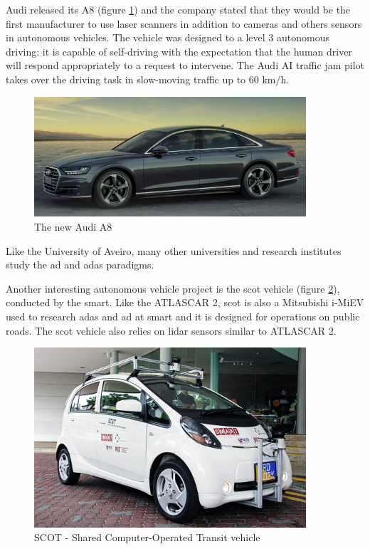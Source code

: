 Audi released its A8 (figure \ref{fig:audi}) and the company stated that they would be the first manufacturer to use laser scanners in addition to cameras and others sensors in autonomous vehicles. The vehicle was designed to a level 3 autonomous driving: it is capable of self-driving with the expectation that the human driver will respond appropriately to a request to intervene. The Audi AI traffic jam pilot takes over the driving task in slow-moving traffic up to 60 km/h. \cite{AudiMediaCenter}

\begin{figure}[htp]
	
	\centering
	\includegraphics[width=0.9\textwidth]{capstate/imgs/audi}
	
	\caption{The new Audi A8}
	\label{fig:audi}
	
\end{figure}

Like the University of Aveiro, many other universities and research institutes study the \gls{ad} and \gls{adas} paradigms.

Another interesting autonomous vehicle project is the \gls{scot} vehicle (figure \ref{fig:scot}), conducted by the \gls{smart}. \cite{Singapore-MITAllianceforResearchandTechnology} Like the ATLASCAR 2, \gls{scot} is also a Mitsubishi i-MiEV used to research \gls{adas} and \gls{ad} at \gls{smart} and it is designed for operations on public roads. The \gls{scot} vehicle also relies on \gls{lidar} sensors similar to ATLASCAR 2. \cite{Teo}

\begin{figure}[htp]
	
	\centering
	\includegraphics[width=0.9\textwidth]{capstate/imgs/scot}
	
	\caption{SCOT - Shared Computer-Operated Transit vehicle}
	\label{fig:scot}
	
\end{figure}


